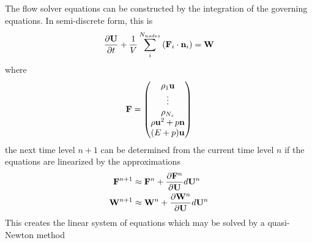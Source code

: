 The flow solver equations can be constructed by the integration of the governing
equations.  In semi-discrete form, this is 
\begin{equation}
  \frac{\partial \mathbf U}{\partial t} + \frac{1}{V} \sum_{i}^{N_{nodes}}
  \left( \mathbf F_i \cdot \mathbf{n}_i \right) = \mathbf W
  \label{semi-discrete}
\end{equation}
where
\begin{equation}
  \mathbf F = 
  \begin{pmatrix}
    \rho_1 \mathbf u \\
    \vdots \\
    \rho_{N_s} \\
    \rho \mathbf u^2 + p\mathbf{n} \\
    (E + p) \mathbf u
  \end{pmatrix}
  \label{f-vec}
\end{equation}
the next time level $n+1$ can be determined from the current time level
$n$ if the equations are linearized by the approximations
\begin{equation}
  \begin{aligned}
    \mathbf F^{n+1} &\approx \mathbf F^{n} + \frac{\partial \mathbf F^{n}}{\partial \mathbf U} d \mathbf U^{n} \\
    \mathbf W^{n+1} &\approx \mathbf W^{n} + \frac{\partial \mathbf W^{n}}{\partial \mathbf U} d \mathbf U^{n}
  \end{aligned}
  \label{linearization-flux}
\end{equation}
This creates the linear system of equations which may be solved by a
quasi-Newton method
